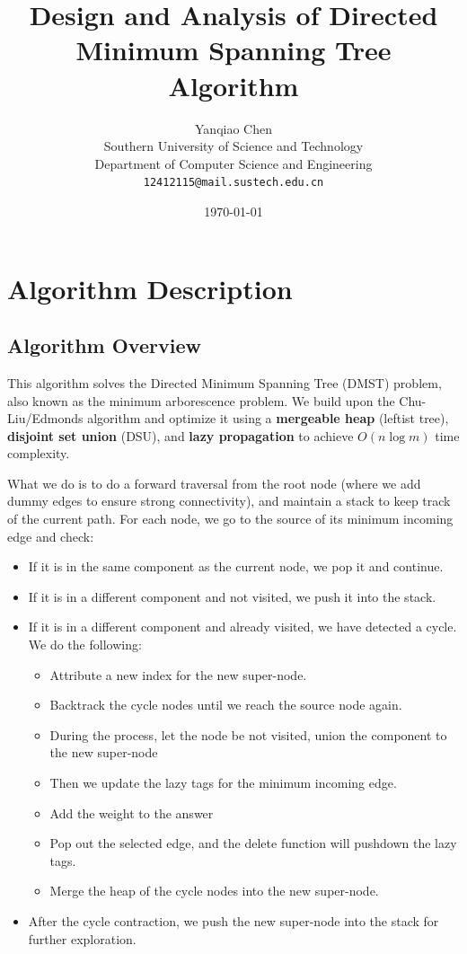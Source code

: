 \documentclass[UTF8, a4paper]{article}
\title{\bf{Design and Analysis of Directed Minimum Spanning Tree Algorithm}}
\author{Yanqiao Chen\\
        Southern University of Science and Technology\\
        Department of Computer Science and Engineering\\
        \texttt{12412115@mail.sustech.edu.cn}}
\date{\today}
\theoremstyle{definition}
\begin{document}
\maketitle

\section{Algorithm Description}

\subsection{Algorithm Overview}

This algorithm solves the Directed Minimum Spanning Tree (DMST) problem, also known as the minimum arborescence problem. We build upon the Chu-Liu/Edmonds algorithm and optimize it using a \textbf{mergeable heap} (leftist tree), \textbf{disjoint set union} (DSU), and \textbf{lazy propagation} to achieve $O(n \log m)$ time complexity.

What we do is to do a forward traversal from the root node (where we add dummy edges to ensure strong connectivity), and maintain 
a stack to keep track of the current path. For each node, we go to the source of its minimum incoming
edge and check: 
\begin{itemize}
    \item If it is in the same component as the current node, we pop it and continue. 
    \item If it is in a different component and not visited, we push it into the stack. 
    \item If it is in a different component and already visited, we have detected a cycle. We do the following: 
          \begin{itemize}
            \item Attribute a new index for the new super-node. 
            \item Backtrack the cycle nodes until we reach the source node again. 
            \item During the process, let the node be not visited, union the component to the new super-node 
            \item Then we update the lazy tags for the minimum incoming edge. 
            \item Add the weight to the answer 
            \item Pop out the selected edge, and the delete function will pushdown the lazy tags.
            \item Merge the heap of the cycle nodes into the new super-node.
          \end{itemize}
    \item After the cycle contraction, we push the new super-node into the stack for further exploration.
\end{itemize}
\end{document}
